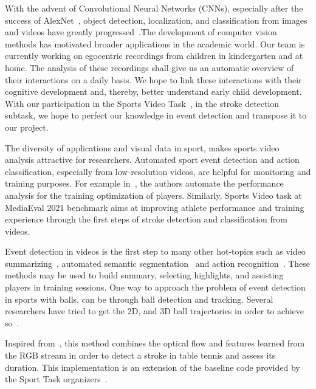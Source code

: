 \documentclass[sigconf]{acmart-me}
\begin{document}
With the advent of Convolutional Neural Networks (CNNs), especially after the success of AlexNet~\cite{krizhevsky2012imagenet}, object detection, localization, and classification from images and videos have greatly progressed~\cite{krizhevsky2012imagenet,girshick2015fast,wang2013action,carreira2017quo}.The development of computer vision methods has motivated broader applications in the academic world. Our team is currently working on egocentric recordings from children in kindergarten and at home. The analysis of these recordings shall give us an automatic overview of their interactions on a daily basis. We hope to link these interactions with their cognitive development and, thereby, better understand early child development. With our participation in the Sports Video Task~\cite{mediaeval/Martin21/task}, in the stroke detection subtask, we hope to perfect our knowledge in event detection and transpose it to our project.
\par
The diversity of applications and visual data in sport, makes sports video analysis attractive for researchers. Automated sport event detection and action classification, especially from low-resolution videos, are helpful for monitoring and training purposes. For example in~\cite{hughes2002use,lees2003science}, the authors automate the performance analysis for the training optimization of players. Similarly, Sports Video task at MediaEval 2021 benchmark aims at improving athlete performance and training experience through the first steps of stroke detection and classification from videos.
\par
Event detection in videos is the first step to many other hot-topics such as video summarizing~\cite{khan2015video}, automated semantic segmentation~\cite{ballan2011event} and action recognition~\cite{dhamsania2016survey,martin2020fine}. These methods may be used to build summary, selecting highlights, and assisting players in training sessions. One way to approach the problem of event detection in sports with balls, can be through ball detection and tracking. Several researchers have tried to get the 2D, and 3D ball trajectories in order to achieve so~\cite{tamaki2013reconstruction,myint2015tracking,myint2016tracking}.
\par
Inspired from~\cite{koch2015siamese,PeICIP19,PeICPR20,voeikov2020ttnet}, this method combines the optical flow and features learned from the RGB stream in order to detect a stroke in table tennis and assess its duration. This implementation is an extension of the baseline code provided by the Sport Task organizers~\cite{mediaeval/Martin21/baseline}.
\end{document}
